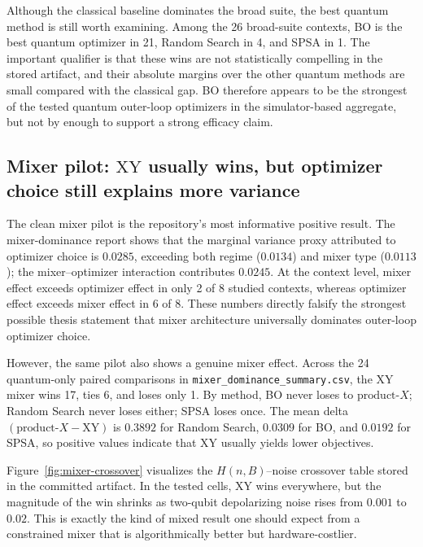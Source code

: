 \documentclass[11pt]{article}
\begin{document}
Although the classical baseline dominates the broad suite, the best quantum method is still worth examining. Among the 26 broad-suite contexts, BO is the best quantum optimizer in 21, Random Search in 4, and SPSA in 1. The important qualifier is that these wins are not statistically compelling in the stored artifact, and their absolute margins over the other quantum methods are small compared with the classical gap. BO therefore appears to be the strongest of the tested quantum outer-loop optimizers in the simulator-based aggregate, but not by enough to support a strong efficacy claim.

\subsection{Mixer pilot: \(\mathrm{XY}\) usually wins, but optimizer choice still explains more variance}

The clean mixer pilot is the repository's most informative positive result. The mixer-dominance report shows that the marginal variance proxy attributed to optimizer choice is \(0.0285\), exceeding both regime (\(0.0134\)) and mixer type (\(0.0113\)); the mixer--optimizer interaction contributes \(0.0245\). At the context level, mixer effect exceeds optimizer effect in only 2 of 8 studied contexts, whereas optimizer effect exceeds mixer effect in 6 of 8. These numbers directly falsify the strongest possible thesis statement that mixer architecture universally dominates outer-loop optimizer choice.

However, the same pilot also shows a genuine mixer effect. Across the 24 quantum-only paired comparisons in \texttt{mixer\_dominance\_summary.csv}, the \(\mathrm{XY}\) mixer wins 17, ties 6, and loses only 1. By method, BO never loses to \(\mathrm{product}\text{-}X\); Random Search never loses either; SPSA loses once. The mean delta \((\mathrm{product}\text{-}X - \mathrm{XY})\) is \(0.3892\) for Random Search, \(0.0309\) for BO, and \(0.0192\) for SPSA, so positive values indicate that \(\mathrm{XY}\) usually yields lower objectives.

Figure~\ref{fig:mixer-crossover} visualizes the \(H(n,B)\)--noise crossover table stored in the committed artifact. In the tested cells, \(\mathrm{XY}\) wins everywhere, but the magnitude of the win shrinks as two-qubit depolarizing noise rises from \(0.001\) to \(0.02\). This is exactly the kind of mixed result one should expect from a constrained mixer that is algorithmically better but hardware-costlier.
\end{document}
